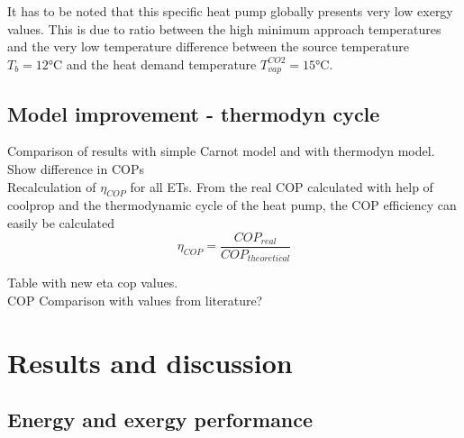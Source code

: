 \documentclass{article}
\begin{document}
It has to be noted that this specific heat pump globally presents very low  exergy values. This is due to ratio between the high minimum approach temperatures and the very low temperature difference between the source temperature $T_{b} = 12 \si{\celsius}$ and the heat demand temperature $T_{vap}^{CO2} = 15 \si{\celsius}$.

\subsection{Model improvement - thermodyn cycle}
Comparison of results with simple Carnot model and with thermodyn model. Show difference in COPs\\

Recalculation of $\eta_{COP}$ for all ETs. From the real COP calculated with help of coolprop and the thermodynamic cycle of the heat pump, the COP efficiency can easily be calculated
\begin{equation}
\eta_{COP} = \frac{COP_{real}}{COP_{theoretical}}
\end{equation}

Table with new eta cop values.\\

COP Comparison with values from literature?\\


\newpage
\section{Results and discussion}

\subsection{Energy and exergy performance}
\end{document}
